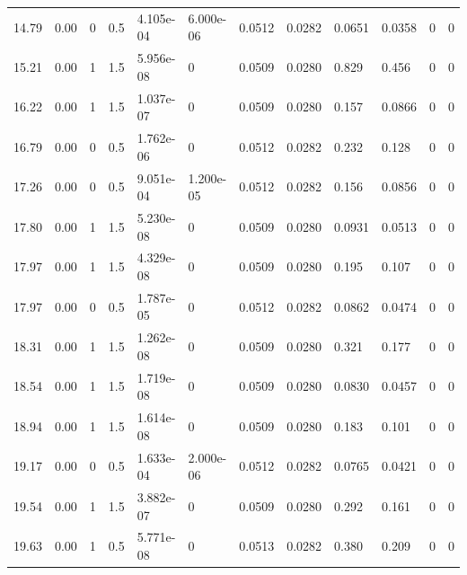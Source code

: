 \documentclass[preview]{standalone}
\begin{document}
{{\begin{tabular}{L{1.2cm}C{1.2cm} C{0.3cm}C{0.5cm} C{1.4cm}C{1.4cm} C{1.4cm}C{1.4cm} C{1.6cm}C{1.6cm} C{1.6cm}C{1.6cm}}
  14.79  &  0.00  & 0     & 0.5 &  4.105e-04  & 6.000e-06  &  0.0512&   0.0282& 0.0651 & 0.0358   &  0 & 0  \\ 
  15.21  &  0.00  & 1     & 1.5 &  5.956e-08  & 0  &  0.0509&   0.0280& 0.829 & 0.456   &  0 & 0  \\ 
  16.22  &  0.00  & 1     & 1.5 &  1.037e-07  & 0  &  0.0509&   0.0280& 0.157 & 0.0866   &  0 & 0  \\ 
  16.79  &  0.00  & 0     & 0.5 &  1.762e-06  & 0  &  0.0512&   0.0282& 0.232 & 0.128   &  0 & 0  \\ 
  17.26  &  0.00  & 0     & 0.5 &  9.051e-04  & 1.200e-05  &  0.0512&   0.0282& 0.156 & 0.0856   &  0 & 0  \\ 
  17.80  &  0.00  & 1     & 1.5 &  5.230e-08  & 0  &  0.0509&   0.0280& 0.0931 & 0.0513   &  0 & 0  \\ 
  17.97  &  0.00  & 1     & 1.5 &  4.329e-08  & 0  &  0.0509&   0.0280& 0.195 & 0.107   &  0 & 0  \\ 
  17.97  &  0.00  & 0     & 0.5 &  1.787e-05  & 0  &  0.0512&   0.0282& 0.0862 & 0.0474   &  0 & 0  \\ 
  18.31  &  0.00  & 1     & 1.5 &  1.262e-08  & 0  &  0.0509&   0.0280& 0.321 & 0.177   &  0 & 0  \\ 
  18.54  &  0.00  & 1     & 1.5 &  1.719e-08  & 0  &  0.0509&   0.0280& 0.0830 & 0.0457   &  0 & 0  \\ 
  18.94  &  0.00  & 1     & 1.5 &  1.614e-08  & 0  &  0.0509&   0.0280& 0.183 & 0.101   &  0 & 0  \\ 
  19.17  &  0.00  & 0     & 0.5 &  1.633e-04  & 2.000e-06  &  0.0512&   0.0282& 0.0765 & 0.0421   &  0 & 0  \\ 
  19.54  &  0.00  & 1     & 1.5 &  3.882e-07  & 0  &  0.0509&   0.0280& 0.292 & 0.161   &  0 & 0  \\ 
  19.63  &  0.00  & 1     & 0.5 &  5.771e-08  & 0  &  0.0513&   0.0282& 0.380 & 0.209   &  0 & 0  \\ 
\hline 
\end{tabular} 

}}
\end{document}
